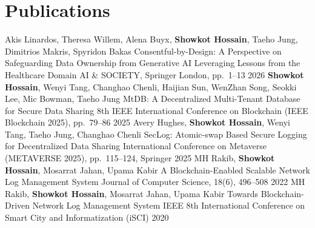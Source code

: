 \documentclass{academic-cv}
\begin{document}
\section{Publications}
\begin{cvpublications}
    \cvpublication
        {Akis Linardos, Theresa Willem, Alena Buyx, \textbf{Showkot Hossain}, Taeho Jung, Dimitrios Makris, Spyridon Bakas}
        {Consentful-by-Design: A Perspective on Safeguarding Data Ownership from Generative AI Leveraging Lessons from the Healthcare Domain}
        {AI \& SOCIETY, Springer London, pp.\ 1--13}
        {2026}
    \cvpublication
        {\textbf{Showkot Hossain}, Wenyi Tang, Changhao Chenli, Haijian Sun, WenZhan Song, Seokki Lee, Mic Bowman, Taeho Jung}
        {MtDB: A Decentralized Multi-Tenant Database for Secure Data Sharing}
        {8th IEEE International Conference on Blockchain (IEEE Blockchain 2025), pp.\ 79--86}
        {2025}
    \cvpublication
        {Avery Hughes, \textbf{Showkot Hossain}, Wenyi Tang, Taeho Jung, Changhao Chenli}
        {SecLog: Atomic-swap Based Secure Logging for Decentralized Data Sharing}
        {International Conference on Metaverse (METAVERSE 2025), pp.\ 115--124, Springer}
        {2025}
    \cvpublication
        {MH Rakib, \textbf{Showkot Hossain}, Mosarrat Jahan, Upama Kabir}
        {A Blockchain-Enabled Scalable Network Log Management System}
        {Journal of Computer Science, 18(6), 496--508}
        {2022}
    \cvpublication
        {MH Rakib, \textbf{Showkot Hossain}, Mosarrat Jahan, Upama Kabir}
        {Towards Blockchain-Driven Network Log Management System}
        {IEEE 8th International Conference on Smart City and Informatization (iSCI)}
        {2020}
\end{cvpublications}

\end{document}
